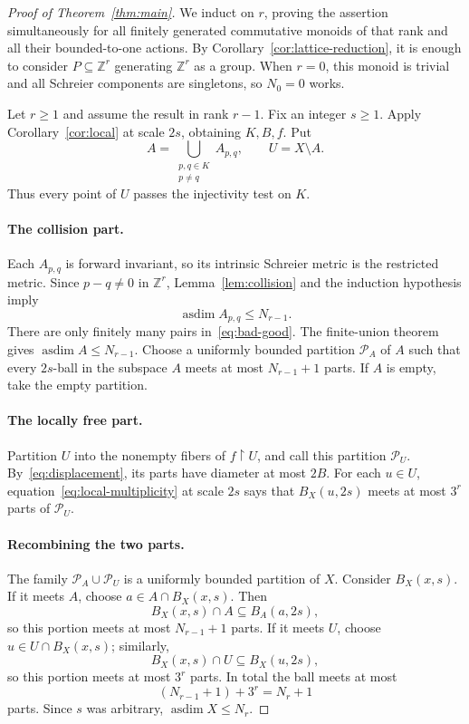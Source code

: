 \documentclass[10pt,a4paper]{amsart}
\DeclareMathOperator{\asdim}{asdim}
\newcommand{\ZZ}{\mathbb Z}
\newcommand{\cP}{\mathcal P}
\begin{document}
\begin{proof}[Proof of Theorem~\ref{thm:main}]
We induct on $r$, proving the assertion simultaneously for all finitely
generated commutative monoids of that rank and all their bounded-to-one
actions. By Corollary~\ref{cor:lattice-reduction}, it is enough to consider
$P\subseteq\ZZ^r$ generating $\ZZ^r$ as a group. When $r=0$, this monoid
is trivial and all Schreier components are singletons, so $N_0=0$ works.

Let $r\ge1$ and assume the result in rank $r-1$. Fix an integer $s\ge1$.
Apply Corollary~\ref{cor:local} at scale $2s$, obtaining $K,B,f$. Put
\begin{equation}\label{eq:bad-good}
 A=\bigcup_{\substack{p,q\in K\\p\ne q}}A_{p,q},
 \qquad U=X\setminus A.
\end{equation}
Thus every point of $U$ passes the injectivity test on $K$.

\paragraph{The collision part.}
Each $A_{p,q}$ is forward invariant, so its intrinsic Schreier metric is
the restricted metric. Since $p-q\ne0$ in $\ZZ^r$,
Lemma~\ref{lem:collision} and the induction hypothesis imply
\[
 \asdim A_{p,q}\le N_{r-1}.
\]
There are only finitely many pairs in~\eqref{eq:bad-good}. The finite-union
theorem gives $\asdim A\le N_{r-1}$. Choose a uniformly bounded partition
$\cP_A$ of $A$ such that every $2s$-ball in the subspace $A$ meets at most
$N_{r-1}+1$ parts. If $A$ is empty, take the empty partition.

\paragraph{The locally free part.}
Partition $U$ into the nonempty fibers of $f\upharpoonright U$, and call
this partition $\cP_U$. By~\eqref{eq:displacement}, its parts have diameter
at most $2B$. For each $u\in U$, equation~\eqref{eq:local-multiplicity} at
scale $2s$ says that $B_X(u,2s)$ meets at most $3^r$ parts of $\cP_U$.

\paragraph{Recombining the two parts.}
The family $\cP_A\cup\cP_U$ is a uniformly bounded partition of $X$.
Consider $B_X(x,s)$. If it meets $A$, choose $a\in A\cap B_X(x,s)$. Then
\[
 B_X(x,s)\cap A\subseteq B_A(a,2s),
\]
so this portion meets at most $N_{r-1}+1$ parts. If it meets $U$, choose
$u\in U\cap B_X(x,s)$; similarly,
\[
 B_X(x,s)\cap U\subseteq B_X(u,2s),
\]
so this portion meets at most $3^r$ parts. In total the ball meets at most
\[
 (N_{r-1}+1)+3^r=N_r+1
\]
parts. Since $s$ was arbitrary, $\asdim X\le N_r$.
\end{proof}
\end{document}
